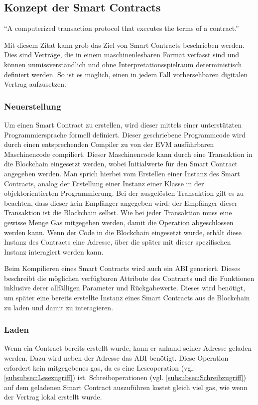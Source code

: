 \subsection{Konzept der Smart Contracts}
\label{subsec:Recherche_Smart_Contracts}
``A computerized transaction protocol that executes the terms of a contract.''\cite{BlockchainRevolution}

Mit diesem Zitat kann grob das Ziel von Smart Contracts beschrieben werden. Dies sind Verträge, die in einem maschinenlesbaren Format verfasst sind und können unmissverständlich und ohne Interpretationsspielraum deterministisch definiert werden. So ist es möglich, einen in jedem Fall vorhersehbaren digitalen Vertrag aufzusetzen.

\subsubsection{Neuerstellung}
\label{subsubsec:Neuerstellung}
Um einen Smart Contract zu erstellen, wird dieser mittels einer unterstützten Programmiersprache formell definiert. Dieser geschriebene Programmcode wird durch einen entsprechenden Compiler zu von der \acrfull{EVM} ausführbaren Maschinencode compiliert. Dieser Maschinencode kann durch eine Transaktion in die Blockchain eingesetzt werden, wobei Initialwerte für den Smart Contract angegeben werden. Man sprich hierbei vom Erstellen einer Instanz des Smart Contracts, analog der Erstellung einer Instanz einer Klasse in der objektorientierten Programmierung. Bei der ausgelösten Transaktion gilt es zu beachten, dass dieser kein Empfänger angegeben wird; der Empfänger dieser Transaktion ist die Blockchain selbst. Wie bei jeder Transaktion muss eine gewisse Menge Gas mitgegeben werden, damit die Operation abgeschlossen werden kann. Wenn der Code in die Blockchain eingesetzt wurde, erhält diese Instanz des Contracts eine Adresse, über die später mit dieser spezifischen Instanz interagiert werden kann.\cite[Solidity in Depth/Contracts/Creating Contracts]{solidity.readthedocs.io}

Beim Kompilieren eines Smart Contracts wird auch ein \acrfull{ABI} generiert. Dieses beschreibt die möglichen verfügbaren Attribute des Contracts und die Funktionen inklusive derer allfälligen Parameter und Rückgabewerte. Dieses wird benötigt, um später eine bereits erstellte Instanz eines Smart Contracts aus de Blockchain zu laden und damit zu interagieren.\cite{media.consensys.net/events-and-logs}

\subsubsection{Laden}
Wenn ein Contract bereits erstellt wurde, kann er anhand seiner Adresse geladen werden. Dazu wird neben der Adresse das \acrshort{ABI} benötigt. Diese Operation erfordert kein mitgegebenes gas, da es eine Leseoperation (vgl. \ref{subsubsec:Lesezugriff}) ist. Schreiboperationen (vgl. \ref{subsubsec:Schreibzugriff}) auf dem geladenen Smart Contract auszuführen kostet gleich viel gas, wie wenn der Vertrag lokal erstellt wurde.\cite[Solidity in Depth/Contracts/Creating Contracts]{solidity.readthedocs.io}

